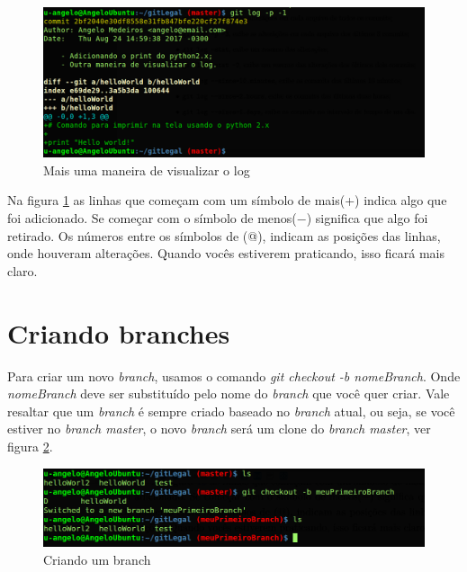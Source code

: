 \documentclass[12pt,openright,oneside,a4paper,english,brazil]{abntex2}
\begin{document}
\begin{figure}[H]
	\caption{\label{logp}Mais uma maneira de visualizar o log}
	\begin{center}
		\includegraphics[width=1\linewidth]{logp}
	\end{center}
\end{figure}

Na figura \ref{logp} as linhas que começam com um símbolo de mais(+) indica algo que foi adicionado. Se começar com o símbolo de menos($-$) significa que algo foi retirado. Os números entre os símbolos de (@), indicam as posições das linhas, onde houveram alterações. Quando vocês estiverem praticando, isso ficará mais claro.

\section{Criando branches}

Para criar um novo \textit{branch}, usamos o comando \textit{git checkout -b nomeBranch}. Onde \textit{nomeBranch} deve ser substituído pelo nome do \textit{branch} que você quer criar. Vale resaltar que um \textit{branch} é sempre criado baseado no \textit{branch} atual, ou seja, se você estiver no\textit{ branch master}, o novo \textit{branch} será um clone do \textit{branch master}, ver figura \ref{novobranch}.

\begin{figure}[H]
	\caption{\label{novobranch}Criando um branch}
	\begin{center}
		\includegraphics[width=1\linewidth]{novobranch}
	\end{center}
\end{figure}
\end{document}

